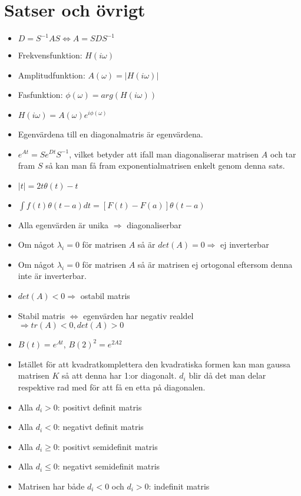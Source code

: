 \documentclass[a4paper]{article}
\begin{document}
\section{Satser och övrigt}
\begin{itemize}
\item $D=S^{-1}AS \Leftrightarrow A=SDS^{-1}$
\item Frekvensfunktion: $H(i\omega)$
\item Amplitudfunktion: $A(\omega)=|H(i\omega)|$
\item Fasfunktion:      $\phi(\omega)=arg(H(i\omega))$
\item $H(i\omega)=A(\omega)e^{i\phi(\omega)}$
\item Egenvärdena till en diagonalmatris är egenvärdena.
\item $e^{At}=Se^{Dt}S^{-1}$, vilket betyder att ifall man diagonaliserar matrisen $A$ och tar fram $S$ så kan man få fram exponentialmatrisen enkelt genom denna sats.
\item $|t|=2t\theta(t)-t$
\item ${\int}f(t)\theta(t-a)dt=[F(t)-F(a)]\theta(t-a)$
\item Alla egenvärden är unika $\Rightarrow$ diagonaliserbar
\item Om något $\lambda_i=0$ för matrisen $A$ så är $det(A)=0\Rightarrow$ ej inverterbar 
\item Om något $\lambda_i=0$ för matrisen $A$ så är matrisen ej ortogonal eftersom denna inte är inverterbar.
\item $det(A)<0\Rightarrow$ ostabil matris
\item Stabil matris $\Leftrightarrow$ egenvärden har negativ realdel $\Rightarrow tr(A)<0, det(A)>0$
\item $B(t)=e^{At}$, $B(2)^2=e^{2A2}$
\item Istället för att kvadratkomplettera den kvadratiska formen kan man gaussa matrisen $K$ så att denna har 1:or diagonalt. $d_i$ blir då det man delar respektive rad med för att få en etta på diagonalen.
\item Alla $d_i>0$: positivt definit matris
\item Alla $d_i<0$: negativt definit matris
\item Alla $d_i\geq0$: positivt semidefinit matris
\item Alla $d_i\leq0$: negativt semidefinit matris
\item Matrisen har både $d_i<0$ och $d_i>0$: indefinit matris
\end{itemize}
\end{document}
